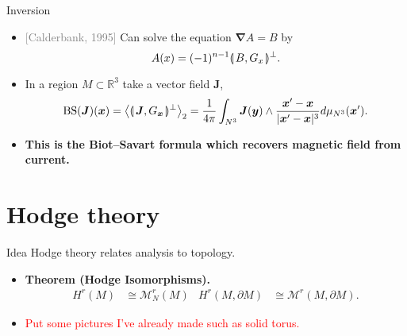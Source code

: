 \documentclass[aspectratio=169]{beamer}
\makeatletter
\newcommand\boldgold[1]{\textcolor{csu_gold}{\textbf{#1}}}
\newcommand\grey[1]{\textcolor{gray}{#1}}
\let\llangle\@undefined
\let\rrangle\@undefined
\newcommand{\directedintproduct}[2]{\llparenthesis \hspace*{.5mm}#1 , #2\hspace*{.5mm} \rrparenthesis}
\newcommand{\multivecinnerproduct}[2]{\llangle \hspace*{.5mm} #1, #2 \hspace*{.5mm} \rrangle}
\newcommand{\R}{\mathbb{R}}
\newcommand{\grad}{\boldsymbol{\nabla}}
\newcommand{\monogenics}{\mathcal{M}}
\newcommand{\blade}[1]{\boldsymbol{#1}}
\newcommand{\boundary}{{\partial M}}
\DeclarePairedDelimiter\angles{\langle}{\rangle}
\newcommand{\proj}[2]{\angles*{#2}_{#1}}
\makeatother
\begin{document}
\begin{frame}{Inversion}
\vfill
\begin{itemize}
  \pause
  \item \grey{[Calderbank, 1995]} Can solve the equation $\grad A=B$ by
\[
A(x) = (-1)^{n-1}\directedintproduct{B}{G_x}^\perp.
\]
  \pause
  \item In a region $M\subset \R^3$ take a vector field $\blade{J}$,
  \[
  \operatorname{BS}(\blade{J})(\blade{x}) = \proj{2}{\directedintproduct{\blade{J}}{G_{\blade{x}}}^\perp} = \frac{1}{4\pi} \int_{N^3} \blade{J}(\blade{y}) \wedge \frac{\blade{x}'-\blade{x}}{|\blade{x}'-\blade{x}|^{3}} d\mu_{N^3}(\blade{x}').
  \]
  \pause
  \item \boldgold{This is the Biot--Savart formula which recovers magnetic field from current.}
  \end{itemize}
\vfill
\end{frame}


\section{Hodge theory}

\begin{frame}{Idea}
\vfill
Hodge theory relates analysis to topology.
\begin{itemize}
  \pause
  \item \boldgold{Theorem (Hodge Isomorphisms).
  \begin{align*}
    H^r(M) &\cong \monogenics^r_N(M) & H^r(M,\boundary)&\cong \monogenics^r(M,\boundary).
  \end{align*}
  }
  \pause
  \item \textcolor{red}{Put some pictures I've already made such as solid torus.}
\end{itemize}
\vfill
\end{frame}
\end{document}
